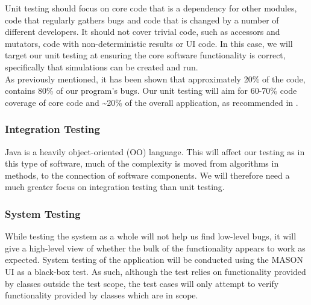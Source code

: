 \documentclass[11pt]{article}
\begin{document}
Unit testing should focus on core code that is a dependency for other modules, code that regularly gathers bugs and code that is changed by a number of different developers.
It should not cover trivial code, such as accessors and mutators, code with non-deterministic results or UI code.\cite{dont_test_blindly}
In this case, we will target our unit testing at ensuring the core software functionality is correct, specifically that simulations can be created and run.
\\

As previously mentioned, it has been shown that approximately 20\% of the code, contains 80\% of our program's bugs.
Our unit testing will aim for 60-70\% code coverage of core code and \textasciitilde 20\% of the overall application, as recommended in \cite{dont_test_blindly}.

\subsubsection{Integration Testing}

Java is a heavily object-oriented (OO) language. This will affect our testing as in this type of software, much of the complexity is moved from algorithms in methods, to the connection of software components\cite[pp.236]{introduction_book}. We will therefore need a much greater focus on integration testing than unit testing.




\subsubsection{System Testing}
While testing the system as a whole will not help us find low-level bugs, it will give a high-level view of whether the bulk of the functionality appears to work as expected.
System testing of the application will be conducted using the MASON UI as a black-box test. As such, although the test relies on functionality provided by classes outside the test scope, the test cases will only attempt to verify functionality provided by classes which are in scope.
\\
\end{document}
